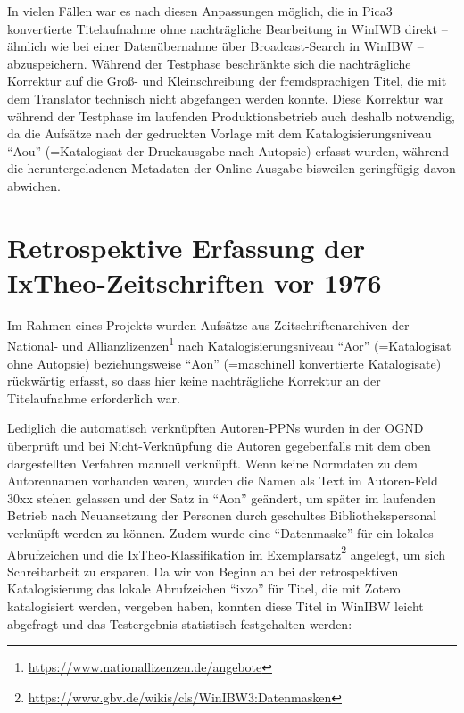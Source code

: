 \documentclass[a4paper,
fontsize=11pt,
oneside,
numbers=noperiodatend,
parskip=half-,
bibliography=totoc,
final
]{scrartcl}
\begin{document}
In vielen Fällen war es nach diesen Anpassungen möglich, die in Pica3
konvertierte Titelaufnahme ohne nachträgliche Bearbeitung in WinIWB
direkt -- ähnlich wie bei einer Datenübernahme über Broadcast-Search in
WinIBW -- abzuspeichern. Während der Testphase beschränkte sich die
nachträgliche Korrektur auf die Groß- und Kleinschreibung der
fremdsprachigen Titel, die mit dem Translator technisch nicht abgefangen
werden konnte. Diese Korrektur war während der Testphase im laufenden
Produktionsbetrieb auch deshalb notwendig, da die Aufsätze nach der
gedruckten Vorlage mit dem Katalogisierungsniveau \enquote{Aou}
(=Katalogisat der Druckausgabe nach Autopsie) erfasst wurden, während
die heruntergeladenen Metadaten der Online-Ausgabe bisweilen geringfügig
davon abwichen.

\section*{Retrospektive Erfassung der IxTheo-Zeitschriften vor
1976}\label{retrospektive-erfassung-der-ixtheo-zeitschriften-vor-1976}

Im Rahmen eines Projekts wurden Aufsätze aus Zeitschriftenarchiven der
National- und Allianzlizenzen\footnote{\url{https://www.nationallizenzen.de/angebote}}
nach Katalogisierungsniveau \enquote{Aor} (=Katalogisat ohne Autopsie)
beziehungsweise \enquote{Aon} (=maschinell konvertierte Katalogisate)
rückwärtig erfasst, so dass hier keine nachträgliche Korrektur an der
Titelaufnahme erforderlich war.

Lediglich die automatisch verknüpften Autoren-PPNs wurden in der OGND
überprüft und bei Nicht-Verknüpfung die Autoren gegebenfalls mit dem
oben dargestellten Verfahren manuell verknüpft. Wenn keine Normdaten zu
dem Autorennamen vorhanden waren, wurden die Namen als Text im
Autoren-Feld 30xx stehen gelassen und der Satz in \enquote{Aon}
geändert, um später im laufenden Betrieb nach Neuansetzung der Personen
durch geschultes Bibliothekspersonal verknüpft werden zu können. Zudem
wurde eine \enquote{Datenmaske} für ein lokales Abrufzeichen und die
IxTheo-Klassifikation im Exemplarsatz\footnote{\url{https://www.gbv.de/wikis/cls/WinIBW3:Datenmasken}}
angelegt, um sich Schreibarbeit zu ersparen. Da wir von Beginn an bei
der retrospektiven Katalogisierung das lokale Abrufzeichen
\enquote{ixzo} für Titel, die mit Zotero katalogisiert werden, vergeben
haben, konnten diese Titel in WinIBW leicht abgefragt und das
Testergebnis statistisch festgehalten werden:
\end{document}
